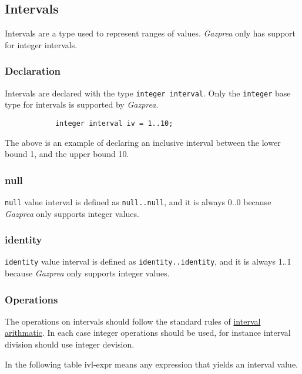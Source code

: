 \documentclass[../../gazprea.tex]{subfiles}
\begin{document}
	\subsection{Intervals}\label{sec:interval}
		Intervals are a type used to represent ranges of values.
 		\textit{Gazprea} only has support for integer intervals.

	\subsubsection{Declaration}

		Intervals are declared with the type \texttt{integer interval}. Only the \texttt{integer} base type for
		intervals is supported by \textit{Gazprea}.

		\begin{lstlisting}
			integer interval iv = 1..10;
		\end{lstlisting}

		The above is an example of declaring an inclusive interval between the lower bound 1, and the upper bound 10.

	\subsubsection{null}

		\texttt{null} value interval is defined as \texttt{null..null}, and it is always 0..0 because \textit{Gazprea}
		only supports integer values.

	\subsubsection{identity}

		\texttt{identity} value interval is defined as \texttt{identity..identity}, and it is always 1..1 because
		\textit{Gazprea} only supports integer values.

	\subsubsection{Operations}

		The operations on intervals should follow the standard rules of
		\href{http://en.wikipedia.org/wiki/Interval_arithmetic}{interval arithmatic}. In each case integer operations
		should be used, for instance interval division should use integer devision.

		In the following table ivl-expr means any expression that yields an interval value.
\end{document}
